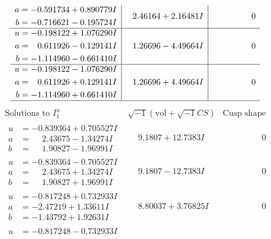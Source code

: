 \documentclass[1p]{elsarticle_modified}
\theoremstyle{definition}
\newcommand{\I}{\sqrt{-1}}
\begin{document}
$$\begin{array}{c|c|c}
\begin{aligned}
a &= -0.591734 + 0.890779 I \\
b &= -0.716621 - 0.195724 I\end{aligned}
 & \phantom{-}2.46164 + 2.16481 I & \phantom{-0.000000 } 0 \\ \hline\begin{aligned}
u &= -0.198122 + 1.076290 I \\
a &= \phantom{-}0.611926 - 0.129141 I \\
b &= -1.114960 - 0.661410 I\end{aligned}
 & \phantom{-}1.26696 - 4.49664 I & \phantom{-0.000000 } 0 \\ \hline\begin{aligned}
u &= -0.198122 - 1.076290 I \\
a &= \phantom{-}0.611926 + 0.129141 I \\
b &= -1.114960 + 0.661410 I\end{aligned}
 & \phantom{-}1.26696 + 4.49664 I & \phantom{-0.000000 } 0\\
 \hline 
 \end{array}$$\newpage$$\begin{array}{c|c|c}  
\text{Solutions to }I^u_{1}& \I (\text{vol} + \sqrt{-1}CS) & \text{Cusp shape}\\
 \hline 
\begin{aligned}
u &= -0.839364 + 0.705527 I \\
a &= \phantom{-}2.43675 - 1.34274 I \\
b &= \phantom{-}1.90827 - 1.96991 I\end{aligned}
 & \phantom{-}9.1807 + 12.7383 I & \phantom{-0.000000 } 0 \\ \hline\begin{aligned}
u &= -0.839364 - 0.705527 I \\
a &= \phantom{-}2.43675 + 1.34274 I \\
b &= \phantom{-}1.90827 + 1.96991 I\end{aligned}
 & \phantom{-}9.1807 - 12.7383 I & \phantom{-0.000000 } 0 \\ \hline\begin{aligned}
u &= -0.817248 + 0.732933 I \\
a &= -2.47219 + 1.33611 I \\
b &= -1.43792 + 1.92631 I\end{aligned}
 & \phantom{-}8.80037 + 3.76825 I & \phantom{-0.000000 } 0 \\ \hline\begin{aligned}
u &= -0.817248 - 0.732933 I \\

\end{aligned}
\end{array}$$
\end{document}
